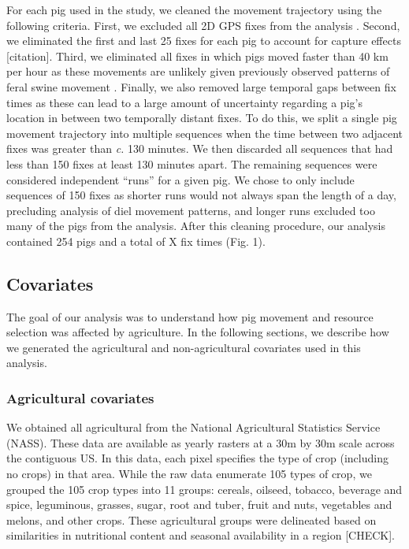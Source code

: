 \documentclass[a4paper]{article}
\begin{document}
For each pig used in the study, we cleaned the movement trajectory using the following criteria. First, we excluded all 2D GPS fixes from the analysis \citep{Bjorneraas2010}.  Second, we eliminated the first and last 25 fixes for each pig to account for capture effects [citation]. Third, we eliminated all fixes in which pigs moved faster than 40 km per hour as these movements are unlikely given previously observed patterns of feral swine movement \citep{Mayer2009}. Finally, we also removed large temporal gaps between fix times as these can lead to a large amount of uncertainty regarding a pig's location in between two temporally distant fixes. To do this, we split a single pig movement trajectory into multiple sequences when the time between two adjacent fixes was greater than \emph{c.} 130 minutes. We then discarded all sequences that had less than 150 fixes at least 130 minutes apart. The remaining sequences were considered independent ``runs'' for a given pig. We chose to only include sequences of 150 fixes as shorter runs would not always span the length of a day, precluding analysis of diel movement patterns, and longer runs excluded too many of the pigs from the analysis. After this cleaning procedure, our analysis contained 254 pigs and a total of X fix times (Fig. 1).

\subsection*{Covariates}

The goal of our analysis was to understand how pig movement and resource selection was affected by agriculture.  In the following sections, we describe how we generated the agricultural and non-agricultural covariates used in this analysis.

\subsubsection*{Agricultural covariates}

We obtained all agricultural from the National Agricultural Statistics Service (NASS). These data are available as yearly rasters at a 30m by 30m scale across the contiguous US. In this data, each pixel specifies the type of crop (including no crops) in that area.  While the raw data enumerate 105 types of crop, we grouped the 105 crop types into 11 groups: cereals, oilseed, tobacco, beverage and spice, leguminous, grasses, sugar, root and tuber, fruit and nuts, vegetables and melons, and other crops.  These agricultural groups were delineated based on similarities in nutritional content and seasonal availability in a region [CHECK].
\end{document}
